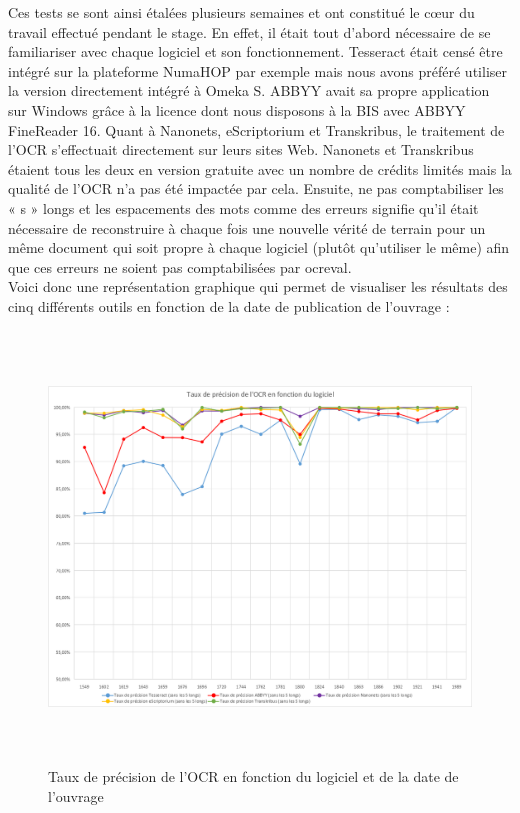 \documentclass[a4paper,12pt,twoside]{book}
\begin{document}
	Ces tests se sont ainsi étalées plusieurs semaines et ont constitué le cœur du travail effectué pendant le stage. En effet, il était tout d'abord nécessaire de se familiariser avec chaque logiciel et son fonctionnement. Tesseract était censé être intégré sur la plateforme NumaHOP par exemple mais nous avons préféré utiliser la version directement intégré à Omeka S. ABBYY avait sa propre application sur Windows grâce à la licence dont nous disposons à la BIS avec ABBYY FineReader 16. Quant à Nanonets, eScriptorium et Transkribus, le traitement de l'OCR s'effectuait directement sur leurs sites Web. Nanonets et Transkribus étaient tous les deux en version gratuite avec un nombre de crédits limités mais la qualité de l'OCR n'a pas été impactée par cela. Ensuite, ne pas comptabiliser les « s » longs et les espacements des mots comme des erreurs signifie qu'il était nécessaire de reconstruire à chaque fois une nouvelle vérité de terrain pour un même document qui soit propre à chaque logiciel (plutôt qu'utiliser le même) afin que ces erreurs ne soient pas comptabilisées par ocreval. \\
	
	Voici donc une représentation graphique qui permet de visualiser les
	résultats des cinq différents outils en fonction de la date de
	publication de l'ouvrage : \\
	
	\begin{figure} [H]
		\includegraphics[width=6.15625in,height=4.5in]{vertopal_157ae480aa4a4b07be198b586a812241/media/image13.png}
		\caption{Taux de précision de l'OCR en fonction du logiciel et de la
			date de l'ouvrage}
	\end{figure}
	
\end{document}
